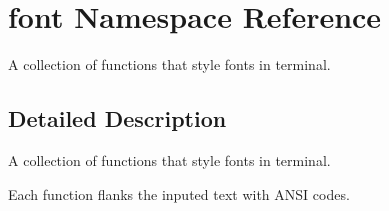 \hypertarget{namespacefont}{}\section{font Namespace Reference}
\label{namespacefont}


A collection of functions that style fonts in terminal.  




\subsection{Detailed Description}
A collection of functions that style fonts in terminal. 

Each function flanks the inputed text with A\+N\+SI codes. 